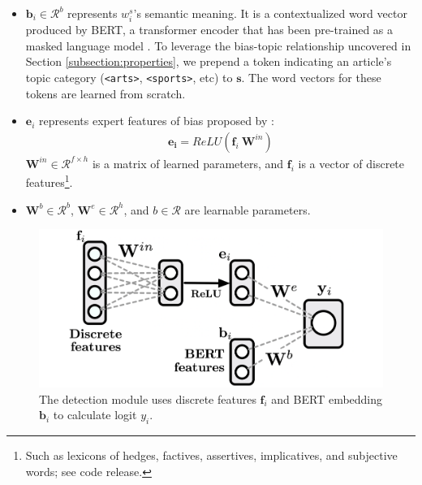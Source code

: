 \begin{itemize}
	\item $\mathbf{b}_i \in \mathcal{R}^{b}$ represents $w^s_i$'s semantic meaning. It is a contextualized word vector produced by BERT, a transformer encoder that has been pre-trained as a masked language model \cite{devlin2018bert}. To leverage the bias-topic relationship uncovered in Section \ref{subsection:properties}, we prepend a token indicating an article's topic category (\texttt{<arts>}, \texttt{<sports>}, etc) to $\mathbf{s}$. The word vectors for these tokens are learned from scratch. 
	
	\item $\mathbf{e}_i$ represents expert features of bias proposed by \cite{recasens2013linguistic}: \vspace*{-4pt}
		\begin{align}
		    \mathbf{e_i} = ReLU(\mathbf{f}_i\ \mathbf{W}^{in})
		\end{align}
		$\mathbf{W}^{in} \in \mathcal{R}^{f \times h}$ is a matrix of learned parameters, and $\mathbf{f}_i$ is a vector of discrete features\footnote{ Such as lexicons of hedges, factives, assertives,  implicatives, and subjective words; see  code release.}. %

	\item $\mathbf{W}^{b} \in \mathcal{R}^{b}$, $\mathbf{W}^{e} \in \mathcal{R}^{h}$, and $b \in \mathcal{R}$ are learnable parameters. 
\end{itemize}
\begin{figure}[t]
\includegraphics[width=1\linewidth]{tagger.png}
\caption{The detection module uses discrete features $\mathbf{f}_i$ and BERT embedding $\mathbf{b}_i$ to calculate logit $y_i$.}%
\label{figure:tagger}
\end{figure}
